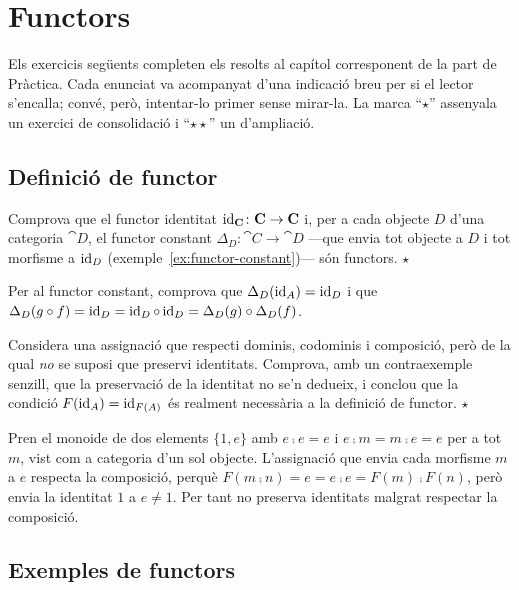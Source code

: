 \chapter{Functors}

Els exercicis següents completen els resolts al capítol corresponent de la part de Pràctica. Cada enunciat va acompanyat d'una indicació breu per si el lector s'encalla; convé, però, intentar-lo primer sense mirar-la. La marca \enquote{$\star$} assenyala un exercici de consolidació i \enquote{$\star\star$} un d'ampliació.

\section{Definició de functor}

\begin{exercici}
Comprova que el functor identitat $\operatorname{id}_{\mathbf{C}}\colon\mathbf{C}\to\mathbf{C}$ i, per a cada objecte $D$ d'una categoria $\cat{D}$, el functor constant $\Delta_D\colon\cat{C}\to\cat{D}$ ---que envia tot objecte a $D$ i tot morfisme a $\operatorname{id}_D$ (exemple~\ref{ex:functor-constant})--- són functors. \hfill{\normalfont$\star$}
\begin{indicacio}
Per al functor constant, comprova que $\Delta_D(\operatorname{id}_A)=\operatorname{id}_D$ i que $\Delta_D(g\circ f)=\operatorname{id}_D=\operatorname{id}_D\circ\operatorname{id}_D=\Delta_D(g)\circ\Delta_D(f)$.
\end{indicacio}
\end{exercici}

\begin{exercici}\label{ex:identitat-necessaria}
Considera una assignació que respecti dominis, codominis i composició, però de la qual \emph{no} se suposi que preservi identitats. Comprova, amb un contraexemple senzill, que la preservació de la identitat no se'n dedueix, i conclou que la condició $F(\operatorname{id}_A)=\operatorname{id}_{F(A)}$ és realment necessària a la definició de functor. \hfill{\normalfont$\star$}
\begin{indicacio}
Pren el monoide de dos elements $\{1,e\}$ amb $e\comp e=e$ i $e\comp m=m\comp e=e$ per a tot $m$, vist com a categoria d'un sol objecte. L'assignació que envia cada morfisme $m$ a $e$ respecta la composició, perquè $F(m\comp n)=e=e\comp e=F(m)\comp F(n)$, però envia la identitat $1$ a $e\neq 1$. Per tant no preserva identitats malgrat respectar la composició.
\end{indicacio}
\end{exercici}

\section{Exemples de functors}

